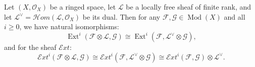 Let $(X,\mathcal{O}_X)$ be a ringed space, let $\mathcal{L}$ be a locally free sheaf of finite rank, and let $\mathcal{L}^\vee = \mathcal{H}om(\mathcal{L},\mathcal{O}_X)$ be its dual. Then for any $\mathcal{F},\mathcal{G} \in \operatorname{Mod}(X)$ and all $i \geqslant 0$, we have natural isomorphisms:
$$\operatorname{Ext}^i(\mathcal{F} \otimes \mathcal{L}, \mathcal{G}) \cong \operatorname{Ext}^i(\mathcal{F}, \mathcal{L}^\vee \otimes \mathcal{G}),$$
and for the sheaf $\mathcal{E}xt$:
$$\mathcal{E}xt^i(\mathcal{F} \otimes \mathcal{L}, \mathcal{G}) \cong \mathcal{E}xt^i(\mathcal{F}, \mathcal{L}^\vee \otimes \mathcal{G}) \cong \mathcal{E}xt^i(\mathcal{F},\mathcal{G}) \otimes \mathcal{L}^\vee.$$
